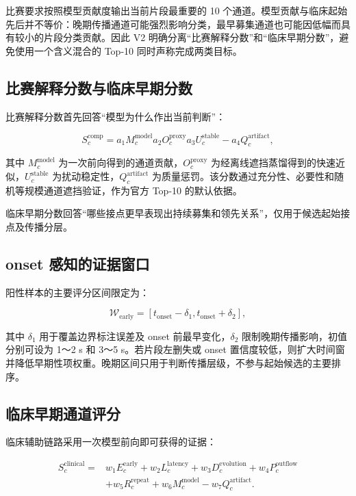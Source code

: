 比赛要求按照模型贡献度输出当前片段最重要的 10 个通道。模型贡献与临床起始先后并不等价：晚期传播通道可能强烈影响分类，最早募集通道也可能因低幅而具有较小的片段分类贡献。因此 V2 明确分离“比赛解释分数”和“临床早期分数”，避免使用一个含义混合的 Top-10 同时声称完成两类目标。

\subsection{比赛解释分数与临床早期分数}

比赛解释分数首先回答“模型为什么作出当前判断”：

$$
S_c^{\mathrm{comp}}=
a_1M_c^{\mathrm{model}}
a_2O_c^{\mathrm{proxy}}
a_3U_c^{\mathrm{stable}}
-a_4Q_c^{\mathrm{artifact}},
$$

其中 $M_c^{\mathrm{model}}$ 为一次前向得到的通道贡献，$O_c^{\mathrm{proxy}}$ 为经离线遮挡蒸馏得到的快速近似，$U_c^{\mathrm{stable}}$ 为扰动稳定性，$Q_c^{\mathrm{artifact}}$ 为质量惩罚。该分数通过充分性、必要性和随机等规模通道遮挡验证，作为官方 Top-10 的默认依据。

临床早期分数回答“哪些接点更早表现出持续募集和领先关系”，仅用于候选起始接点及传播分层。

\subsection{onset 感知的证据窗口}

阳性样本的主要评分区间限定为：

$$
\mathcal{W}_{\mathrm{early}}=
[t_{\mathrm{onset}}-\delta_1,
t_{\mathrm{onset}}+\delta_2],
$$

其中 $\delta_1$ 用于覆盖边界标注误差及 onset 前最早变化，$\delta_2$ 限制晚期传播影响，初值分别可设为 1～2 s 和 3～5 s。若片段左删失或 onset 置信度较低，则扩大时间窗并降低早期性项权重。晚期区间只用于判断传播层级，不参与起始候选的主要排序。

\subsection{临床早期通道评分}

临床辅助链路采用一次模型前向即可获得的证据：

\[
\begin{aligned}
S_c^{\mathrm{clinical}}={}&
w_1E_c^{\mathrm{early}}+w_2L_c^{\mathrm{latency}}
+w_3D_c^{\mathrm{evolution}}+w_4P_c^{\mathrm{outflow}}\\
&+w_5R_c^{\mathrm{repeat}}+w_6M_c^{\mathrm{model}}
-w_7Q_c^{\mathrm{artifact}}.
\end{aligned}
\]

